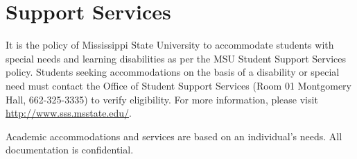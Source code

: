 \section{Support Services}

It is the policy of Mississippi State University to accommodate students with special needs and learning disabilities as per the MSU Student Support Services policy. Students seeking accommodations on the basis of a disability or special need must contact the Office of Student Support Services (Room 01 Montgomery Hall, 662-325-3335) to verify eligibility. For more information, please visit \url{http://www.sss.msstate.edu/}.

Academic accommodations and services are based on an individual’s needs.  All documentation is confidential. 

